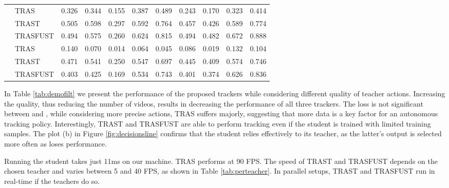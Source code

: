 \documentclass[runningheads]{llncs}
\makeatletter
\def\myalgonamefirst{TRAS\@\xspace}
\def\myalgonamesecond{TRAST\@\xspace}
\def\myalgonamethird{TRASFUST\@\xspace}
\makeatother
\begin{document}
\begin{table*}[t]
\begin{tabular}{l | l | c c c | c c | c c | c c }
		\midrule
		
		 & \myalgonamefirst	& 0.326 & 0.344 & 0.155 & 0.387 & 0.489 & 0.243 & 0.170 & 0.323 & 0.414 \\
		& \myalgonamesecond	& 0.505 & 0.598 & 0.297	& 0.592 & 0.764 & 0.457 & 0.426 & 0.589 & 0.774 \\
		\multirow{-3}{*}{} & \myalgonamethird	& 0.494	& 0.575	& 0.260 & 0.624 & 0.815 & 0.494 & 0.482	& 0.672 & 0.888 \\
		
		\midrule
		
		 & \myalgonamefirst	& 0.140 & 0.070 & 0.014 & 0.064 & 0.045 & 0.086 & 0.019 & 0.132 & 0.104 \\
		& \myalgonamesecond	& 0.471 & 0.541 & 0.250	& 0.547 & 0.697 & 0.445 & 0.409 & 0.574	& 0.746 \\
		\multirow{-3}{*}{} & \myalgonamethird	& 0.403	& 0.425	& 0.169 & 0.534 & 0.743 & 0.401 & 0.374 & 0.626 & 0.836 \\
		
		\bottomrule		
\end{tabular}
\end{table*} In Table \ref{tab:demofilt} we present the performance of the proposed trackers while considering different quality of teacher actions. Increasing the quality, thus reducing the number of videos, results in decreasing the performance of all three trackers. The loss is not significant between  and , while considering more precise actions, \myalgonamefirst suffers majorly, suggesting that more data is a key factor for an autonomous tracking policy. Interestingly, \myalgonamesecond and \myalgonamethird are able to perform tracking even if the student is trained with limited training samples. The plot (b) in Figure \ref{fig:decisionsline} confirms that the student relies effectively to its teacher, as the latter's output is selected more often as  loses performance.

Running the student takes just 11ms on our machine. \myalgonamefirst performs at 90 FPS. The speed of \myalgonamesecond and \myalgonamethird depends on the chosen teacher and varies between 5 and 40 FPS, as shown in Table \ref{tab:perteacher}. In parallel setups, \myalgonamesecond and \myalgonamethird run in real-time if the teachers do so. 
\end{document}
